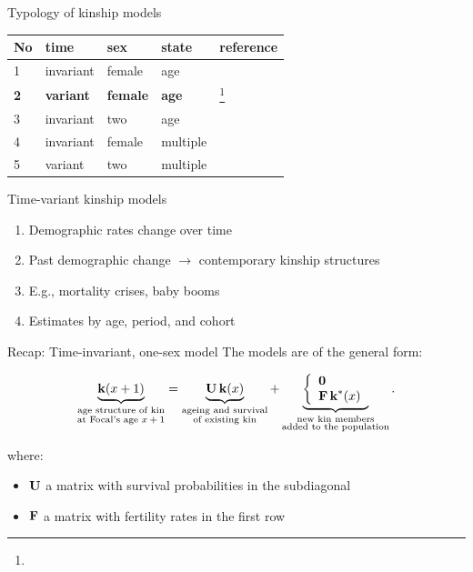 ﻿\documentclass{beamer}
\newcommand{\fcite}[1]{\footnote{\fullcite{#1}}}
\begin{document}
\begin{frame}{Typology of kinship models}

\begin{table}[]
\begin{tabular}{@{}lllll@{}}
\toprule
No & time      & sex    & state    & reference \\ \midrule
1 & invariant & female & age & \\ 
\textbf{2} & \textbf{variant}   & \textbf{female} & \textbf{age} & \fcite{caswell_formal_2021} \\
3 & invariant & two   & age & \\
4 & invariant   & female   &  multiple & \\ 
5 & variant   & two   &  multiple & \\ \bottomrule
\end{tabular}
\end{table}

\end{frame}

\begin{frame}{Time-variant kinship models}
    \begin{enumerate}
        \item Demographic rates change over time
        \item Past demographic change $\rightarrow$ contemporary kinship structures
        \item E.g., mortality crises, baby booms
        \item Estimates by age, period, and cohort  
    \end{enumerate}
\end{frame}

\begin{frame}{Recap: Time-invariant, one-sex model}
    The models are of the general form:

\begin{equation*}
    	\underbrace{{\bf k}(x+1)}_{\substack{\text{age structure of kin}\\ \text{at Focal's age $x+1$}}} = 	
    \underbrace{{\bf U \, k}(x)}_{\substack{\text{ageing and survival}\\ \text{of existing kin}}}
    + 	\underbrace{	\left\{ \begin{array}{l}
    \bm 0 \\
    {\bf F \, k}^*(x)
    \end{array}
    \right.}_{\substack{\text{new kin members}\\ \text{added to the population}}}.
\end{equation*}

where:
\vspace{.2cm}
\begin{itemize}
    \item ${\bf U}$ a matrix with survival probabilities in the subdiagonal
    \item ${\bf F}$ a matrix with fertility rates in the first row
\end{itemize}

\end{frame}
\end{document}
